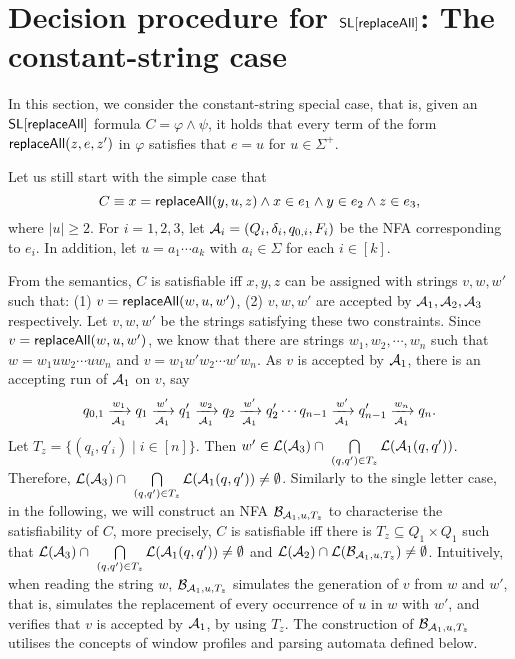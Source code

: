 
\section{Decision procedure for $\mathsf{SL}[\mathsf{replaceAll}]$: The constant-string case}

In this section, we consider the constant-string special case, that is, given an $\mathsf{SL}[\mathsf{replaceAll}]$ formula $C = \varphi \wedge \psi$, it holds that every term of the form $\mathsf{replaceAll}(z, e, z')$ in $\varphi$ satisfies that $e=u$ for $u \in \Sigma^+$.

Let us still start with the simple case that 
$$C \equiv x = \mathsf{replaceAll}(y, u, z) \wedge x \in e_1 \wedge y \in e_2 \wedge z \in e_3,$$
where $|u| \ge 2$. For $i=1,2,3$, let $\mathcal{A}_i = (Q_i, \delta_i, q_{0, i}, F_i)$ 
be the NFA corresponding to $e_i$. In addition, let $u = a_1 \cdots a_k$ with $a_i \in \Sigma$ for each $i \in [k]$.

From the semantics, $C$ is satisfiable iff $x, y, z$ can be assigned with  strings $v, w, w'$ such that: (1) $v = \mathsf{replaceAll}(w, u, w')$, (2) $v,w, w'$ are accepted by $\mathcal{A}_1, \mathcal{A}_2, \mathcal{A}_3$ respectively. Let $v, w, w'$ be the strings satisfying these two constraints. Since $v = \mathsf{replaceAll}(w, u, w')$, we know that there are strings $w_1, w_2, \cdots, w_n$ such that $w= w_1 u w_2 \cdots u w_n$ and $v = w_1 w' w_2 \cdots w' w_n$. As $v$ is accepted by $\mathcal{A}_1$, there is an accepting run of $\mathcal{A}_1$ on $v$, say 
$$
q_{0,1} \xrightarrow[\mathcal{A}_1]{w_1} q_1 \xrightarrow[\mathcal{A}_1]{w'} q'_1 \xrightarrow[\mathcal{A}_1]{w_2} q_2 \xrightarrow[\mathcal{A}_1]{w'} q'_2 \cdots q_{n-1} \xrightarrow[\mathcal{A}_1]{w'} q'_{n-1} \xrightarrow[\mathcal{A}_1]{w_n} q_n.
$$
Let $T_z = \{(q_i, q'_i) \mid i \in [n]\}$. Then $w' \in \mathcal{L}(\mathcal{A}_3) \cap\ \bigcap \limits_{(q,q') \in T_z} \mathcal{L}(\mathcal{A}_1(q, q'))$. Therefore, $\mathcal{L}(\mathcal{A}_3) \cap\ \bigcap \limits_{(q,q') \in T_z} \mathcal{L}(\mathcal{A}_1(q, q')) \neq \emptyset$. Similarly to the single letter case, in the following, we will construct an NFA $\mathcal{B}_{\mathcal{A}_1, u, T_z}$ to characterise the satisfiability of $C$, more precisely, $C$ is satisfiable iff there is $T_z \subseteq Q_1 \times Q_1$ such that $\mathcal{L}(\mathcal{A}_3) \cap\ \bigcap \limits_{(q,q') \in T_z} \mathcal{L}(\mathcal{A}_1(q, q')) \neq \emptyset$ and 
$\mathcal{L}(\mathcal{A}_2) \cap \mathcal{L}(\mathcal{B}_{\mathcal{A}_1, u, T_z}) \neq \emptyset$. Intuitively, when reading the string $w$, $\mathcal{B}_{\mathcal{A}_1, u, T_z}$ simulates the generation of $v$ from $w$ and $w'$, that is, simulates the replacement of  every occurrence of $u$ in $w$ with $w'$, and verifies that $v$ is accepted by $\mathcal{A}_1$, by using $T_z$.
The construction of $\mathcal{B}_{\mathcal{A}_1, u, T_z}$ utilises the concepts of window profiles and parsing automata defined below.
%


